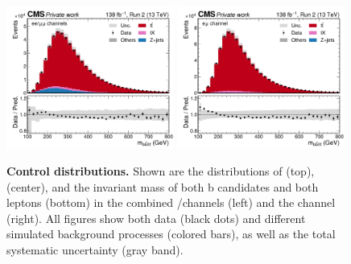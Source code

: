 \begin{figure}[!hp]
    \includegraphics[width=0.49\textwidth]{figures/ah/controlplots/ReqMET/mbbll__sf.pdf}
    \hfill
    \includegraphics[width=0.49\textwidth]{figures/ah/controlplots/ReqMET/mbbll__em.pdf}
    \caption{
        \textbf{Control distributions.} Shown are the distributions of \ptmiss (top), \mll (center), and the invariant mass \mbbll of both b candidates and both leptons (bottom) in the combined \ee/\mumu channels (left) and the \emu channel (right). All figures show both data (black dots) and different simulated background processes (colored bars), as well as the total systematic uncertainty (gray band). 
    }
    \label{fig:ah:control3}
\end{figure}

